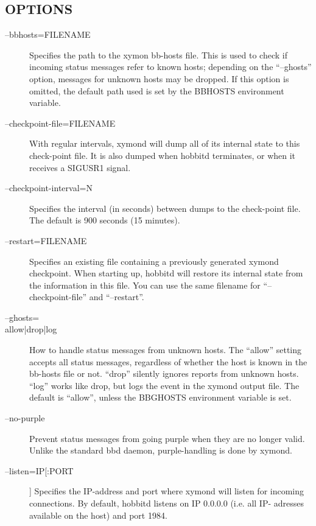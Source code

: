  
\subsection{OPTIONS}
\begin{description}
\item[--bbhosts=FILENAME] Specifies the path to the xymon bb-hosts file. This is used to check if incoming status messages refer to known hosts; depending on the ``--ghosts'' option, messages for unknown hosts may be dropped. If this option is omitted, the default path used is set by the BBHOSTS environment variable. 

 

\item[--checkpoint-file=FILENAME] With regular intervals, xymond will dump all of its internal state to this check-point file. It is also dumped when hobbitd terminates, or when it receives a SIGUSR1 signal. 

 

\item[--checkpoint-interval=N] Specifies the interval (in seconds) between dumps to the check-point file. The default is 900 seconds (15 minutes). 

 

\item[--restart=FILENAME] Specifies an existing file containing a previously generated xymond checkpoint. When starting up, hobbitd will restore its internal state from the information in this file. You can use the same filename for ``--checkpoint-file'' and ``--restart''. 

 

\item[--ghosts= \\{allow|drop|log\\}] How to handle status messages from unknown hosts. The ``allow'' setting accepts all status messages, regardless of whether the host is known in the bb-hosts file or not. ``drop'' silently ignores reports from unknown hosts. ``log'' works like drop, but logs the event in the xymond output file. The default is ``allow'', unless the BBGHOSTS environment variable is set. 

 

\item[--no-purple] Prevent status messages from going purple when they are no longer valid. Unlike the standard bbd daemon, purple-handling is done by xymond. 

 

\item[--listen=IP[:PORT]] Specifies the IP-address and port where xymond will listen for incoming connections. By default, hobbitd listens on IP 0.0.0.0 (i.e. all IP- adresses available on the host) and port 1984. 


\end{description}
